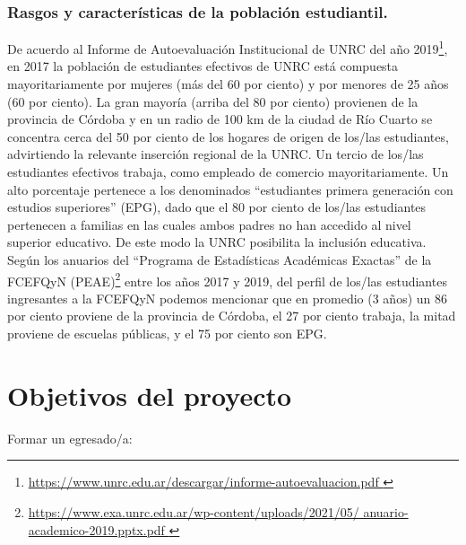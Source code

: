 \documentclass[a4paper, 12pt]{article}
\begin{document}
\subsubsection{Rasgos y características de la población estudiantil.}

De acuerdo al Informe de Autoevaluación Institucional de UNRC del
año 2019\footnote{\href{https://www.unrc.edu.ar/descargar/informe-autoevaluacion.pdf}{https://www.unrc.edu.ar/descargar/informe-autoevaluacion.pdf
}
}, en 2017 la población de estudiantes efectivos de UNRC está
compuesta mayoritariamente por mujeres (más del 60 por ciento) y por
menores de 25 años (60 por ciento). La gran mayoría (arriba del 80 por
ciento) provienen de la provincia de Córdoba y en un radio de 100 km
de la ciudad de Río Cuarto se concentra cerca del 50 por ciento de los
hogares de origen de los/las estudiantes, advirtiendo la relevante inserción
regional de la UNRC. Un tercio de los/las estudiantes efectivos trabaja, como
empleado de comercio mayoritariamente. Un alto porcentaje pertenece
a los denominados “estudiantes primera generación con estudios superiores” (EPG), dado que el 80 por ciento de los/las estudiantes pertenecen
a familias en las cuales ambos padres no han accedido 
al nivel superior educativo. De este modo la UNRC posibilita la inclusión
educativa.
Según los anuarios del “Programa de Estadísticas Académicas Exactas” de la FCEFQyN (PEAE)\footnote{\href{
https://www.exa.unrc.edu.ar/wp-content/uploads/2021/05/
anuario-academico-2019.pptx.pdf
}{https://www.exa.unrc.edu.ar/wp-content/uploads/2021/05/
anuario-academico-2019.pptx.pdf
}} entre los años 2017 y 2019, del perfil de
los/las estudiantes ingresantes a la FCEFQyN podemos mencionar que en promedio (3 años) un 86 por ciento proviene de la provincia de Córdoba, el
27 por ciento trabaja, la mitad proviene de escuelas públicas, y el 75 por
ciento son EPG. 

\section{Objetivos del proyecto}


Formar un egresado/a:
\end{document}
